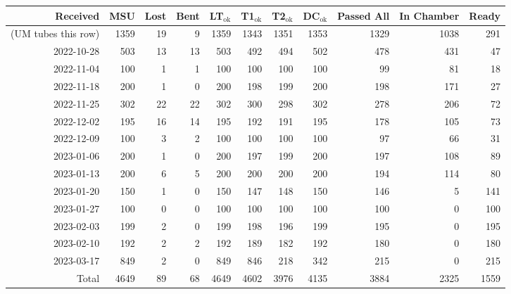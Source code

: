 \begin{tabular}{r|r|r|r|r|r|r|r|r|r|r}
\toprule
           Received &  MSU &  Lost &  Bent &  LT$_\text{ok}$ &  T1$_\text{ok}$ &  T2$_\text{ok}$ &  DC$_\text{ok}$ &  Passed All &  In Chamber &  Ready \\
\midrule
(UM tubes this row) & 1359 &    19 &     9 &            1359 &            1343 &            1351 &            1353 &        1329 &        1038 &    291 \\
         2022-10-28 &  503 &    13 &    13 &             503 &             492 &             494 &             502 &         478 &         431 &     47 \\
         2022-11-04 &  100 &     1 &     1 &             100 &             100 &             100 &             100 &          99 &          81 &     18 \\
         2022-11-18 &  200 &     1 &     0 &             200 &             198 &             199 &             200 &         198 &         171 &     27 \\
         2022-11-25 &  302 &    22 &    22 &             302 &             300 &             298 &             302 &         278 &         206 &     72 \\
         2022-12-02 &  195 &    16 &    14 &             195 &             192 &             191 &             195 &         178 &         105 &     73 \\
         2022-12-09 &  100 &     3 &     2 &             100 &             100 &             100 &             100 &          97 &          66 &     31 \\
         2023-01-06 &  200 &     1 &     0 &             200 &             197 &             199 &             200 &         197 &         108 &     89 \\
         2023-01-13 &  200 &     6 &     5 &             200 &             200 &             200 &             200 &         194 &         114 &     80 \\
         2023-01-20 &  150 &     1 &     0 &             150 &             147 &             148 &             150 &         146 &           5 &    141 \\
         2023-01-27 &  100 &     0 &     0 &             100 &             100 &             100 &             100 &         100 &           0 &    100 \\
         2023-02-03 &  199 &     2 &     0 &             199 &             198 &             196 &             199 &         195 &           0 &    195 \\
         2023-02-10 &  192 &     2 &     2 &             192 &             189 &             182 &             192 &         180 &           0 &    180 \\
         2023-03-17 &  849 &     2 &     0 &             849 &             846 &             218 &             342 &         215 &           0 &    215 \\
              Total & 4649 &    89 &    68 &            4649 &            4602 &            3976 &            4135 &        3884 &        2325 &   1559 \\
\bottomrule
\end{tabular}
